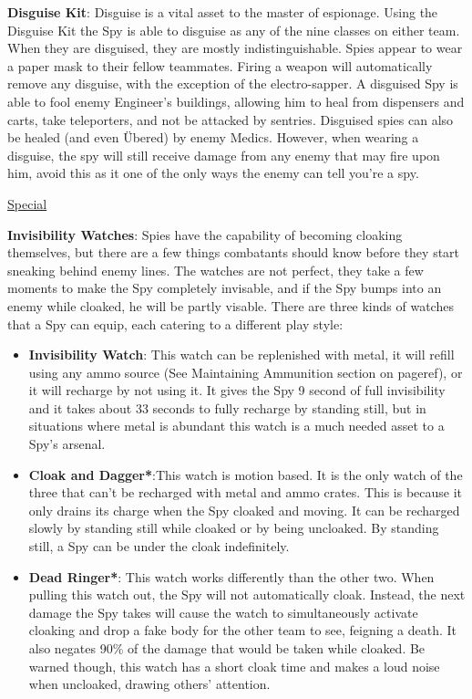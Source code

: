 {\bf Disguise Kit}: Disguise is a vital asset to the master of espionage.  Using the Disguise Kit the Spy is able to disguise as any of the nine classes on either team. When they are disguised, they are mostly indistinguishable.  Spies appear to wear a paper mask to their fellow teammates. Firing a weapon will automatically remove any disguise, with the exception of the electro-sapper. A disguised Spy is able to fool enemy Engineer's buildings, allowing him to heal from dispensers and carts, take teleporters, and not be attacked by sentries.  Disguised spies can also be healed (and even Übered) by enemy Medics. However, when wearing a disguise, the spy will still receive damage from any enemy that may fire upon him, avoid this as it one of the only ways the enemy can tell you're a spy.

\begin {center}
\underline {Special}
\end {center}

{\bf Invisibility Watches}: Spies have the capability of becoming cloaking themselves, but there are a few things combatants should know before they start sneaking behind enemy lines. The watches are not perfect, they take a few moments to make the Spy completely invisable, and if the Spy bumps into an enemy while cloaked, he will be partly visable. There are three kinds of watches that a Spy can equip, each catering to a different play style:
\begin {itemize}
\item {\bf Invisibility Watch}: This watch can be replenished with metal, it will refill using any ammo source (See Maintaining Ammunition section on {{pageref}}), or it will recharge by not using it. It gives the Spy 9 second of full invisibility and it takes about 33 seconds to fully recharge by standing still, but in situations where metal is abundant this watch is a much needed asset to a Spy's arsenal.
\item {\bf Cloak and Dagger*}:This watch is motion based. It is the only watch of the three that can't be recharged with metal and ammo crates. This is because it only drains its charge when the Spy cloaked and moving. It can be recharged slowly by standing still while cloaked or by being uncloaked. By standing still, a Spy can be under the cloak indefinitely. 
\item {\bf Dead Ringer*}: This watch works differently than the other two. When pulling this watch out, the Spy will not automatically cloak. Instead, the next damage the Spy takes will cause the watch to simultaneously activate cloaking and drop a fake body for the other team to see, feigning a death. It also negates 90\% of the damage that would be taken while cloaked. Be warned though, this watch has a short cloak time and makes a loud noise when uncloaked, drawing others' attention.
\end {itemize}


